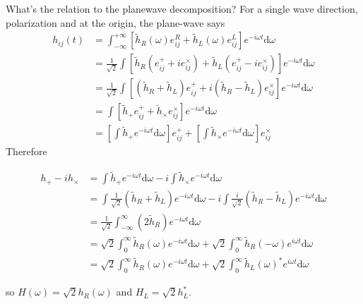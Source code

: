 \documentclass[aps,prd,twocolumn,superscriptaddress,preprintnumbers,floatfix,nofootinbib]{revtex4-2}
\newcommand{\infd}{\mathrm{d}}
\begin{document}
What's the relation to the planewave decomposition?
For a single wave direction, polarization and at the origin, the plane-wave says
\begin{align}
h_{ij}(t) &= \int_{-\infty}^{+\infty} \left[\tilde{h}_R(\omega) e^R_{ij} + \tilde{h}_L(\omega) e^L_{ij}\right] e^{-i\omega t} \infd \omega \nonumber\\ 
&= \frac{1}{\sqrt{2}}\int\left[\tilde{h}_R (e^+_{ij} + i e^\times_{ij}) + \tilde{h}_L (e^+_{ij} - i e^\times_{ij})\right] e^{-i\omega t} \infd \omega \nonumber \\
&= \frac{1}{\sqrt{2}}\int\left[(\tilde{h}_R + \tilde{h}_L) e^+_{ij} + i(\tilde{h}_R-\tilde{h}_L) e^\times_{ij}\right] e^{-i\omega t} \infd \omega \nonumber \\
&=\int\left[\tilde{h}_+  e^+_{ij} + \tilde{h}_\times e^\times_{ij}\right] e^{-i\omega t} \infd \omega \nonumber \\
&=\left[\int\tilde{h}_+e^{-i\omega t} \infd \omega\right]  e^+_{ij} + \left[\int \tilde{h}_\times e^{-i\omega t} \infd \omega\right] e^\times_{ij}
\end{align}
Therefore
\begin{widetext}
\begin{align}
h_+ - i h_\times &= \int\tilde{h}_+e^{-i\omega t} \infd \omega -i \int \tilde{h}_\times e^{-i\omega t} \infd \omega \nonumber \\
&= \int \frac{1}{\sqrt{2}} \left(\tilde{h}_R + \tilde{h}_L \right)e^{-i\omega t} \infd \omega -i \int \frac{i}{\sqrt{2}} \left(\tilde{h}_R - \tilde{h}_L \right) e^{-i\omega t} \infd \omega \nonumber\\
&= \frac{1}{\sqrt{2}} \int_{-\infty}^{\infty} \left(2 \tilde{h}_R \right)e^{-i\omega t} \infd \omega  \nonumber \\
&= \sqrt{2}\int_{0}^{\infty} \tilde{h}_R(\omega) e^{-i\omega t} \infd \omega +
\sqrt{2}\int_{0}^{\infty} \tilde{h}_R(-\omega) e^{i\omega t} \infd \omega \\
&= \sqrt{2}\int_{0}^{\infty} \tilde{h}_R(\omega) e^{-i\omega t} \infd \omega +
\sqrt{2}\int_{0}^{\infty} \tilde{h}_L(\omega)^* e^{i\omega t} \infd \omega
\end{align}
\end{widetext}
so $H(\omega)= \sqrt{2} h_R(\omega)$ and $H_L = \sqrt{2} h_L^*$.
\end{document}
